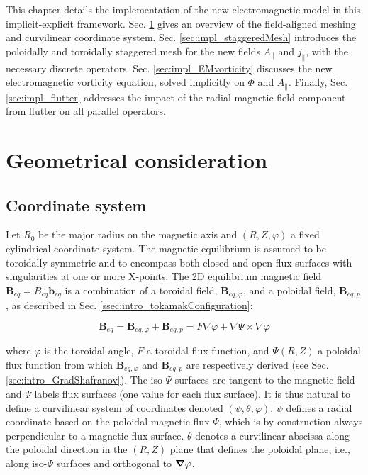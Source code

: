 This chapter details the implementation of the new electromagnetic model in this implicit-explicit framework. Sec. \ref{sec:impl_geometry} gives an overview of the field-aligned meshing and curvilinear coordinate system. Sec. \ref{sec:impl_staggeredMesh} introduces the poloidally and toroidally staggered mesh for the new fields $A_\parallel$ and $j_\parallel$, with the necessary discrete operators. Sec. \ref{sec:impl_EMvorticity} discusses the new electromagnetic vorticity equation, solved implicitly on $\Phi$ and $A_\parallel$. Finally, Sec. \ref{sec:impl_flutter} addresses the impact of the radial magnetic field component from flutter on all parallel operators.


\section{Geometrical consideration}
\label{sec:impl_geometry}

\subsection{Coordinate system}
\label{ssec:Implementation_CoordinateSystem}
Let $R_0$ be the major radius on the magnetic axis and $(R, Z, \varphi)$ a fixed cylindrical coordinate system. The magnetic equilibrium is assumed to be toroidally symmetric and to encompass both closed and open flux surfaces with singularities at one or more X-points. The 2D equilibrium magnetic field $\mathbf{B}_{eq} = B_{eq} \mathbf{b}_{eq}$ is a combination of a toroidal field, $\mathbf{B}_{eq,\varphi}$, and a poloidal field, $\mathbf{B}_{eq,p}$, as described in Sec. \ref{ssec:intro_tokamakConfiguration}:

\begin{equation}
	\mathbf{B}_{eq} = \mathbf{B}_{eq,\varphi} + \mathbf{B}_{eq,p} = F \nabla{\varphi} + \nabla{\Psi} \times \nabla{\varphi}
\end{equation}

where $\varphi$ is the toroidal angle, $F$ a toroidal flux function, and $\Psi(R,Z)$ a poloidal flux function from which $\mathbf{B}_{eq,\varphi}$ and $\mathbf{B}_{eq,p}$ are respectively derived (see Sec. \ref{sec:intro_GradShafranov}). The iso-$\Psi$ surfaces are tangent to the magnetic field and $\Psi$ labels flux surfaces (one value for each flux surface). It is thus natural to define a curvilinear system of coordinates denoted $(\psi, \theta, \varphi)$. $\psi$ defines a radial coordinate based on the poloidal magnetic flux $\Psi$, which is by construction always perpendicular to a magnetic flux surface. $\theta$ denotes a curvilinear abscissa along the poloidal direction in the $(R, Z)$ plane that defines the poloidal plane, i.e., along iso-$\Psi$ surfaces and orthogonal to $\grad  \varphi$. \newline

